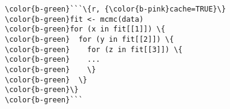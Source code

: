 \documentclass[class=minimal,border=0]{standalone}
\begin{document}
%
\begin{BVerbatim}[bgcolor=b-darkgrey]
\color{b-green}```\{r, {\color{b-pink}cache=TRUE}\}
\color{b-green}fit <- mcmc(data)
\color{b-green}for (x in fit[[1]]) \{
\color{b-green}  for (y in fit[[2]]) \{
\color{b-green}    for (z in fit[[3]]) \{
\color{b-green}    ...
\color{b-green}    \}
\color{b-green}  \}
\color{b-green}\}
\color{b-green}```
\end{BVerbatim}
\end{document}
